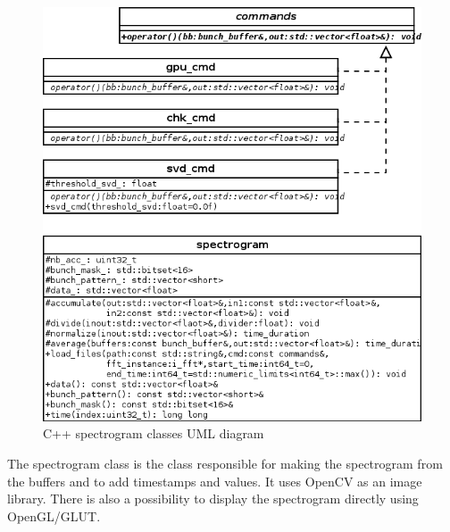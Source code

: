\begin{figure}[H]
\centering
\label{fig:spectrogram_uml}
\caption{C++ spectrogram classes UML diagram}
\includegraphics[scale=0.5]{spectrogram_uml.png}
\end{figure}

The spectrogram class is the class responsible for making the spectrogram from the buffers and to add timestamps and values. It uses \gls{OpenCV} as an image library. There is also a possibility to display the spectrogram directly using \gls{OpenGL}/GLUT.


